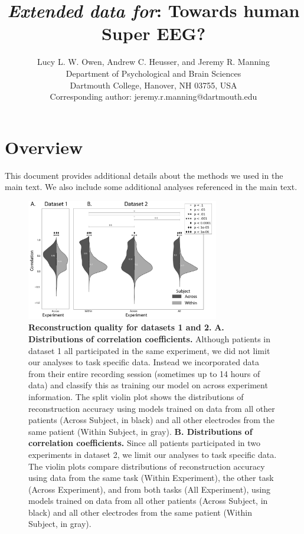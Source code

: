 \documentclass{article}
\title{\textit{Extended data for}: Towards human Super EEG?}
\author{Lucy L. W. Owen, Andrew C. Heusser, and Jeremy R. Manning\\Department of Psychological and Brain Sciences\\Dartmouth College, Hanover, NH 03755, USA\\Corresponding author: jeremy.r.manning@dartmouth.edu}
\begin{document}
\maketitle

\setcounter{equation}{0}
\setcounter{figure}{0}
\setcounter{table}{0}
\setcounter{page}{1}
\setcounter{section}{0}
\makeatletter
\renewcommand{\theequation}{S\arabic{equation}}
\renewcommand{\thefigure}{S\arabic{figure}}
\renewcommand{\bibnumfmt}[1]{[S#1]}
\renewcommand{\citenumfont}[1]{S#1}


\section*{Overview}
This document provides additional details about the methods we used in the main text.  We also include some additional analyses referenced in the main text.


\begin{figure}[phtb]
\centering
\includegraphics[width=0.75\textwidth]{figs/supplemental_1}
\caption{\small \textbf{Reconstruction quality for datasets 1 and 2.} \textbf{A. Distributions
      of correlation coefficients.}  Although patients in dataset 1 all participated in the same experiment, we did not limit our analyses to task specific data.  Instead we incorporated data from their entire recording session (sometimes up to 14 hours of data) and classify this as training our model on across experiment information. The split violin plot shows the distributions of reconstruction accuracy using models trained on data from all other patients (Across Subject, in black) and all other electrodes from the same patient (Within Subject, in gray). \textbf{B.  Distributions of correlation coefficients.} Since all patients participated in two experiments in dataset 2, we limit our analyses to task specific data.  The violin plots compare distributions of reconstruction accuracy using data from the same task (Within Experiment), the other task (Across Experiment), and from both tasks (All Experiment), using models trained on data from all other patients (Across Subject, in black) and all other electrodes from the same patient (Within Subject, in gray).}
\label{fig:supplemental_1}
\end{figure}
\end{document}
